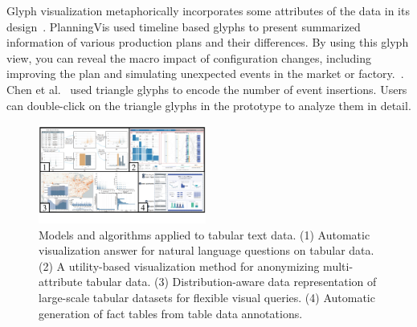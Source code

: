 \documentclass[a4paper,fleqn]{cas-dc}
\begin{document}
Glyph visualization metaphorically incorporates some attributes of the data in its design~\cite{chen2017sequence,sun2019planningvis}. 
PlanningVis used timeline based glyphs to present summarized information of various production plans and their differences. By using this glyph view, you can reveal the macro impact of configuration changes, including improving the plan and simulating unexpected events in the market or factory.~\cite{sun2019planningvis}.
Chen et al.~\cite{chen2017sequence} used triangle glyphs to encode the number of event insertions. Users can double-click on the triangle glyphs in the prototype to analyze them in detail.

\begin{figure}[pos=htb]
	\centering
	\includegraphics[width=0.49\textwidth]{Images/tabulartextdata2.pdf}
	\vspace{-3em}
	\caption{Models and algorithms applied to tabular text data. (1) Automatic visualization answer for natural language questions on tabular data. (2) A utility-based visualization method for anonymizing multi-attribute tabular data. (3) Distribution-aware data representation of large-scale tabular datasets for flexible visual queries. (4) Automatic generation of fact tables from table data annotations. }
	\label{fig:tabulartextdata2}
	\vspace{-1.5em}
\end{figure}

\end{document}
